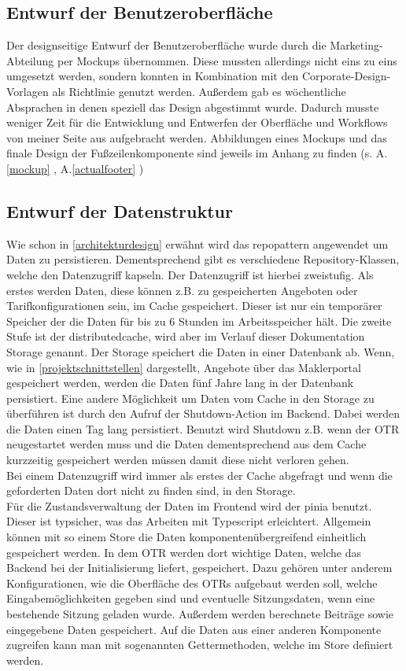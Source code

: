 \subsection{Entwurf der Benutzeroberfläche}
\label{benutzeroberfläche}
Der designseitige Entwurf der Benutzeroberfläche wurde durch die Marketing-Abteilung per Mockups übernommen. Diese mussten allerdings nicht eins zu eins umgesetzt werden, sondern konnten in Kombination mit den Corporate-Design-Vorlagen als Richtlinie genutzt werden. Außerdem gab es wöchentliche Absprachen in denen speziell das Design abgestimmt wurde. Dadurch musste weniger Zeit für die Entwicklung und Entwerfen der Oberfläche und Workflows von meiner Seite aus aufgebracht werden. Abbildungen eines Mockups und das finale Design der Fußzeilenkomponente sind jeweils im Anhang zu finden (s. A.\ref{mockup} , A.\ref{actualfooter} )
\subsection{Entwurf der Datenstruktur}
\label{datenmodell}
Wie schon in \ref{architekturdesign}  erwähnt wird das \gls{repopattern} angewendet um Daten zu persistieren. Dementsprechend gibt es verschiedene Repository-Klassen, welche den Datenzugriff kapseln. Der Datenzugriff ist hierbei zweistufig. Als erstes werden Daten, diese können z.B. zu gespeicherten Angeboten oder Tarifkonfigurationen sein, im Cache gespeichert. Dieser ist nur ein temporärer Speicher der die Daten für bis zu 6 Stunden im Arbeitsspeicher hält. Die zweite Stufe ist der \gls{distributedcache}, wird aber im Verlauf dieser Dokumentation Storage genannt. Der Storage speichert die Daten in einer Datenbank ab.
Wenn, wie in \ref{projektschnittstellen}  dargestellt, Angebote über das Maklerportal gespeichert werden, werden die Daten fünf Jahre lang in der Datenbank persistiert. Eine andere Möglichkeit um Daten vom Cache in den Storage zu überführen ist durch den Aufruf der Shutdown-Action im Backend. Dabei werden die Daten einen Tag lang persistiert. Benutzt wird Shutdown z.B. wenn der \ac{OTR} neugestartet werden muss und die Daten dementsprechend aus dem Cache kurzzeitig gespeichert werden müssen damit diese nicht verloren gehen.\\
Bei einem Datenzugriff wird immer als erstes der Cache abgefragt und wenn die geforderten Daten dort nicht zu finden sind, in den Storage.\\
Für die Zustandsverwaltung der Daten im Frontend wird der \gls{pinia} benutzt. Dieser ist typsicher, was das Arbeiten mit Typescript erleichtert. Allgemein können mit so einem Store die Daten komponentenübergreifend einheitlich gespeichert werden. In dem \ac{OTR} werden dort wichtige Daten, welche das Backend bei der Initialisierung liefert, gespeichert. Dazu gehören unter anderem Konfigurationen, wie die Oberfläche des \ac{OTR}s aufgebaut werden soll, welche Eingabemöglichkeiten gegeben sind und eventuelle Sitzungsdaten, wenn eine bestehende Sitzung geladen wurde. Außerdem werden berechnete Beiträge sowie eingegebene Daten gespeichert. Auf die Daten aus einer anderen Komponente zugreifen kann man mit sogenannten Gettermethoden, welche im Store definiert werden.
